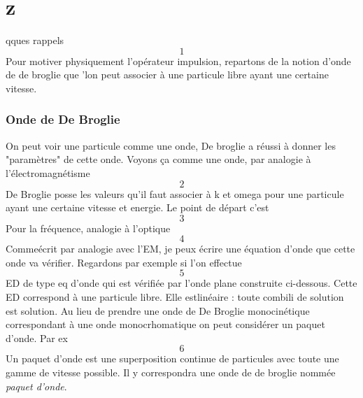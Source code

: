 \chapter{z}
qques rappels
\begin{equation}
1
\end{equation}
Pour motiver physiquement l'opérateur impulsion, repartons de la notion d'onde de de broglie que 
'lon peut associer à une particule libre ayant une certaine vitesse. 
\subsection{Onde de De Broglie}
On peut voir une particule comme une onde, De broglie a réussi à donner les "paramètres" de cette 
onde. Voyons ça comme une onde, par analogie à l'électromagnétisme
\begin{equation}
2
\end{equation}
De Broglie posse les valeurs qu'il faut associer à k et omega pour une particule ayant une certaine 
vitesse et energie. Le point de départ c'est
\begin{equation}
3
\end{equation}
Pour la fréquence, analogie à l'optique
\begin{equation}
4
\end{equation}
Commeécrit par analogie avec l'EM, je peux écrire une équation d'onde que cette onde va vérifier. 
Regardons par exemple si l'on effectue
\begin{equation}
5
\end{equation}
ED de type eq d'onde qui est vérifiée par l'onde plane construite ci-dessous. Cette ED correspond
à une particule libre. Elle estlinéaire : toute combili de solution est solution. Au lieu de prendre
une onde de De Broglie monocinétique correspondant à une onde monocrhomatique on peut considérer
un paquet d'onde. Par ex
\begin{equation}
6
\end{equation}
Un paquet d'onde est une superposition continue de particules avec toute une gamme de vitesse 
possible. Il y correspondra une onde de de broglie nommée \textit{paquet d'onde}.

